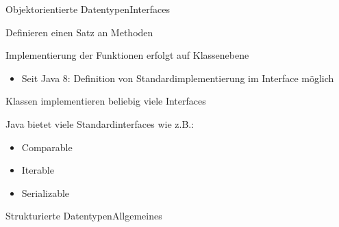 \begin{frame}{Objektorientierte Datentypen}{Interfaces}
	\item Definieren einen Satz an Methoden
	\item Implementierung der Funktionen erfolgt auf Klassenebene
	\begin{itemize}
		\item Seit Java 8: Definition von Standardimplementierung im Interface möglich
	\end{itemize}
	\item Klassen implementieren beliebig viele Interfaces
	\item Java bietet viele Standardinterfaces wie z.B.:
	\begin{itemize}
		\item Comparable
		\item Iterable
		\item Serializable
	\end{itemize}
\end{frame}

\begin{frame}{Strukturierte Datentypen}{Allgemeines}
	
\end{frame}

